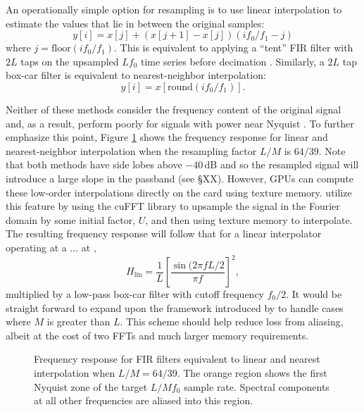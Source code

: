 \documentclass[11pt,preprint]{aastex}
\begin{document}

An operationally simple option for resampling is to use linear interpolation to estimate the values that lie in 
between the original samples:
\begin{equation}
y[i] = x[j] + (x[j+1] - x[j]) (if_0/f_1 - j)
\end{equation}
where $j = \mathrm{floor}(if_0/f_1)$.  This is equivalent to applying a ``tent'' FIR filter with $2L$ taps on the 
upsampled $Lf_0$ time series before decimation \citep{oppenhim10}.  Similarly, a $2L$ tap box-car filter is 
equivalent to nearest-neighbor interpolation:
\begin{equation}
y[i] = x[\mathrm{round}(if_0/f_1)].
\end{equation}

Neither of these methods consider the frequency content of the original signal and, as a result, perform
poorly for signals with power near Nyquist \citep{fraser89}.  To further emphasize this point, Figure 
\ref{fig:windows} shows the frequency response for linear and nearest-neighbor interpolation when 
the resampling factor $L/M$ is $64/39$.  Note that both methods have side lobes above $-40$\,dB and so the 
resampled signal will introduce a large slope in the passband (see \S XX).  However, GPUs can compute 
these low-order interpolations directly on the card using texture memory.  \citet{kim15b} utilize this feature 
by using the cuFFT library to upsample the signal in the Fourier domain by some initial factor, $U$, and then using texture memory to 
interpolate.  The resulting frequency response will follow that for a linear interpolator operating at a ...
at \citep{oppenheim10},
\begin{equation}
H_{\mathrm{lin}} = \frac{1}{L} \left[ \frac{\sin(2 \pi f L/2}{\pi f} \right]^2,
\end{equation}
multiplied by a low-pass box-car filter with cutoff frequency $f_0/2$.  It would be straight forward to 
expand upon the framework introduced by \citet{kim15b} to handle cases where $M$ is greater than $L$.  
This scheme should help reduce loss from aliasing, albeit 
at the cost of two FFTs and much larger memory requirements.

\begin{figure}[H!]
\caption{Frequency response for FIR filters equivalent to linear and nearest interpolation when $L/M = 64/39$.
The orange region shows the first Nyquist zone of the target $L/Mf_0$ sample rate.  Spectral components at all 
other frequencies are aliased into this region.}
\label{fig:windows}
\end{figure}
 
\end{document}
